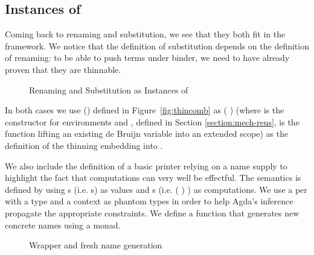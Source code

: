 \subsection{Instances of }

Coming back to renaming and substitution, we see that they both fit in the
\semrec{} framework. We notice that the definition of substitution depends on
the definition of renaming: to be able to push terms under binder, we need to
have already proven that they are thinnable.

\begin{figure}[h]
\begin{minipage}{0.5\textwidth}
\end{minipage}\hfill
\begin{minipage}{0.5\textwidth}
\end{minipage}
\caption{Renaming and Substitution as Instances of \semrec{}}
\end{figure}

In both cases we use () defined in Figure~\ref{fig:thincomb} as
( ) (where  is the constructor for environments and
, defined in Section \ref{section:mech-reus}, is the function lifting an
existing de Bruijn variable into an extended scope) as the definition of the
thinning embedding \AB{$\Gamma$} into {\AB{$\sigma$} \AIC{::} \AB{$\Gamma$}}.

\label{section:printing}
We also include the definition of a basic printer relying on a name supply
to highlight the fact that computations can very well be effectful.
The  semantics is defined by using s (i.e. s)
as values and s (i.e. { ( ) })
as computations. We use a per with a type and a context as phantom types
in order to help Agda's inference propagate the appropriate constraints. We define
a function  that generates new concrete names using a  monad.

\begin{figure}[h]
\begin{minipage}{0.6\textwidth}
\end{minipage}
\begin{minipage}{0.3\textwidth}
\end{minipage}

\begin{minipage}{0.45\textwidth}
\end{minipage}
\begin{minipage}{0.45\textwidth}
\end{minipage}
\caption{Wrapper and fresh name generation}\label{fig:fresh}
\end{figure}

